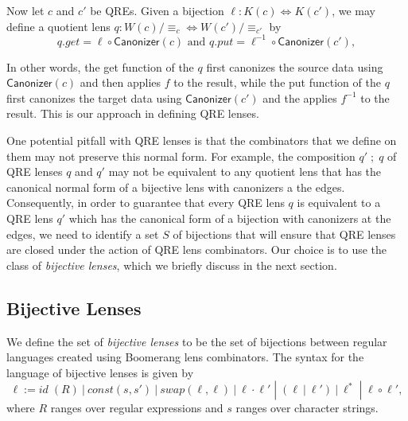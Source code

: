 \documentclass[acmsmall,review,anonymous]{acmart}
\newcommand{\kw}[1]{\ensuremath{\mathsf{#1}}}
\newcommand{\sep}{\ensuremath{\ | \ }}
\newcommand{\canonizer}{\ensuremath{\kw{Canonizer}}}
\newcommand{\eqrel}[1]{\ensuremath{\equiv_{#1}}}
\begin{document}
Now let $c$ and $c'$ be QREs. Given a bijection $\ell : K(c) \Leftrightarrow
K(c')$, we may define a quotient lens $q : W(c)/\eqrel{c} \Leftrightarrow
W(c')/\eqrel{c'}$ by
\begin{equation}\label{normalform}
q.get = \ell \circ \canonizer(c) \text{ and } q.put = \ell^{-1} \circ
\canonizer(c'),
\end{equation}

\noindent In other words, the get function of the $q$ first canonizes the source
data using $\canonizer(c)$ and then applies $f$ to the result, while the
put function of the $q$ first canonizes the target data using
$\canonizer(c')$ and the applies $f^{-1}$ to the result. This is our approach in
defining QRE lenses.

One potential pitfall with QRE lenses is that the combinators that
we define on them may not preserve this normal form. For example, the
composition $q' \; ; \; q$ of QRE lenses $q$ and $q'$ may not be equivalent to
any quotient lens that has the canonical normal form of a bijective lens with
canonizers a the edges. Consequently, in order to guarantee that every QRE
lens $q$ is equivalent to a QRE lens $q'$ which has the canonical form of
a bijection with canonizers at the edges, we need to identify a set $S$ of
bijections that will ensure that QRE lenses are closed under the action of QRE
lens combinators. Our choice is to use the class of \textit{bijective lenses},
which we briefly discuss in the next section.

\subsection{Bijective Lenses}
We define the set of \textit{bijective lenses} to be the set of bijections
between regular languages created using Boomerang lens combinators.
The syntax for the language of bijective lenses is given by
$$\ell := \mathit{id} \; (R) \sep const(s, s') \sep  swap(\ell,
\ell) \sep \ell \cdot \ell' \; |  \; (\ell \sep \ell') \sep \ell^* \;
| \; \ell \circ \ell',$$ where $R$ ranges over regular expressions and $s$
ranges over character strings.
\end{document}
